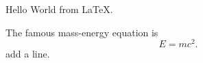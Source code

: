 \documentclass{article}
\begin{document}
Hello World from \LaTeX{}.

The famous mass-energy equation is
\[E = mc^2.\] %
add a line.
\end{document}
